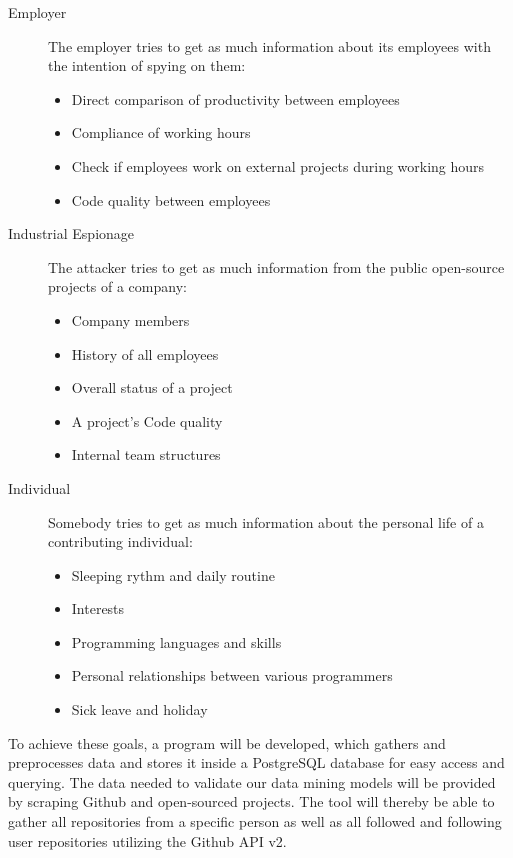 \begin{description}
    \item[Employer]
        The employer tries to get as much information about its employees with the intention of spying on them:
        \begin{itemize}
            \item Direct comparison of productivity between employees
            \item Compliance of working hours
            \item Check if employees work on external projects during working hours
            \item Code quality between employees
        \end{itemize}

    \item[Industrial Espionage]
        The attacker tries to get as much information from the public open-source projects of a company:
        \begin{itemize}
            \item Company members
            \item History of all employees
            \item Overall status of a project
            \item A project's Code quality
            \item Internal team structures
        \end{itemize}

    \item[Individual]
        Somebody tries to get as much information about the personal life of a contributing individual:
        \begin{itemize}
            \item Sleeping rythm and daily routine
            \item Interests
            \item Programming languages and skills
            \item Personal relationships between various programmers
            \item Sick leave and holiday
        \end{itemize}

\end{description}

To achieve these goals, a program will be developed, which gathers and preprocesses data and stores it inside a PostgreSQL database for easy access and querying.
The data needed to validate our data mining models will be provided by scraping Github and open-sourced projects.
The tool will thereby be able to gather all repositories from a specific person as well as all followed and following user repositories utilizing the Github API v2.

